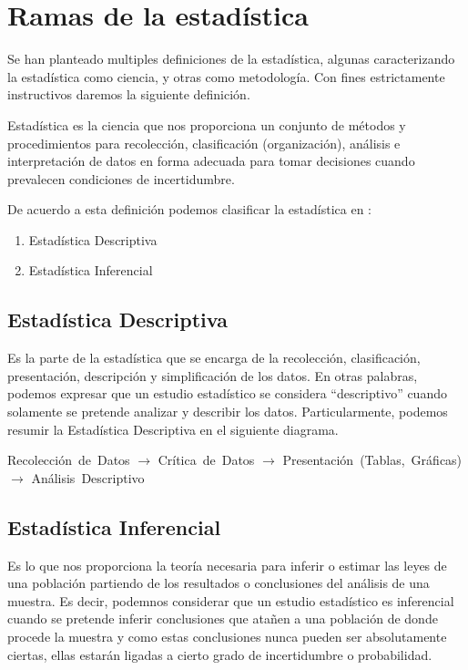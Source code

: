 \section{Ramas de la estadística}
    Se han planteado multiples definiciones de la estadística, algunas 
    caracterizando la estadística como ciencia, y otras como metodología. Con fines
    estrictamente instructivos daremos la siguiente definición. 
        \begin{defi}
            Estadística es la ciencia que nos proporciona un conjunto de métodos
            y procedimientos para recolección, clasificación (organización), análisis
            e interpretación de datos en forma adecuada para tomar decisiones cuando 
            prevalecen condiciones de incertidumbre.
        \end{defi}
    De acuerdo a esta definición podemos clasificar la estadística en :
        \begin{enumerate}
            \item Estadística Descriptiva
            \item Estadística Inferencial
        \end{enumerate}
    \subsection{Estadística Descriptiva}
        Es la parte de la estadística que se encarga de la recolección, clasificación, 
        presentación, descripción y simplificación de los datos. En otras palabras, podemos 
        expresar que un estudio estadístico se considera ``descriptivo'' cuando solamente 
        se pretende analizar y describir los datos. Particularmente, podemos resumir la 
        Estadística Descriptiva en el siguiente diagrama. 
        \begin{center}
            \mbox{Recolección de Datos} $\rightarrow$ \mbox{Crítica de Datos} $\rightarrow$ \mbox{Presentación (Tablas, Gráficas)}$\rightarrow$ \mbox{Análisis Descriptivo}
        \end{center}
    \subsection{Estadística Inferencial}
        Es lo que nos proporciona la teoría necesaria para inferir o estimar las leyes de una población partiendo de los resultados
        o conclusiones del análisis de una muestra. Es decir, podemnos considerar que un 
        estudio estadístico es inferencial cuando se pretende inferir conclusiones que atañen a una 
        población de donde procede la muestra y como estas conclusiones 
        nunca pueden ser absolutamente ciertas, ellas estarán ligadas a cierto grado 
        de incertidumbre o probabilidad.


